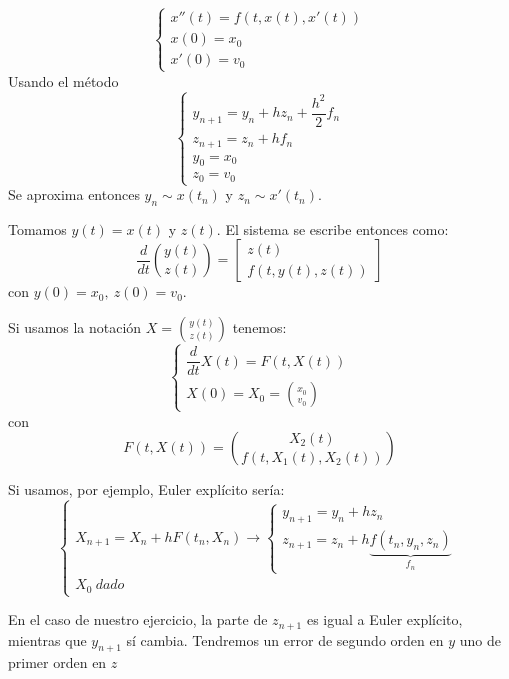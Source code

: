 \documentclass[openany]{book}
\begin{document}
    \setcounter{ex}{15}

    \begin{exercise}
        $$ \left\{
        \begin{array}{l}
            x''(t) = f(t,x(t),x'(t)) \\
            x(0) = x_0\\
            x'(0) = v_0
        \end{array}
        \right. $$
        Usando el método
        $$ \left\{
        \begin{array}{l}
            y_{n+1} = y_n+hz_n+\dfrac{h^2}{2}f_n\\
            z_{n+1} = z_n+hf_n\\
            y_0=x_0\\
            z_0=v_0
        \end{array}
        \right. $$
        Se aproxima entonces $ y_n \sim x(t_n) $ y $ z_n \sim x'(t_n) $.
        
        Tomamos $ y(t) = x(t) $ y $ z(t) $. El sistema se escribe entonces como:
        $$ \dfrac{d}{dt} \binom{y(t)}{z(t)} = \left[ \begin{matrix}
            z(t) \\ f(t,y(t),z(t))
        \end{matrix} \right] $$
        con $ y(0) = x_0,\ z(0) = v_0 $.

        Si usamos la notación $ X = \binom{y(t)}{z(t)} $ tenemos:
        $$ \left\{
        \begin{array}{l}
            \dfrac{d}{dt}X(t) = F(t,X(t))\\
            X(0) = X_0 = \binom{x_0}{v_0}
        \end{array}
        \right. $$
        con
        $$ F(t,X(t)) = \binom{X_2(t)}{f(t,X_1(t),X_2(t))} $$

        Si usamos, por ejemplo, Euler explícito sería:
        $$ \left\{
        \begin{array}{l}
            X_{n+1} = X_n + h F(t_n,X_n) \to \left\{
            \begin{array}{l}
                y_{n+1} = y_n+h z_n\\
                z_{n+1} = z_n+h\underbrace{f(t_n,y_n,z_n)}_{f_n}
            \end{array}
            \right.\\
            X_0\ dado
        \end{array}
        \right. $$

        En el caso de nuestro ejercicio, la parte de $ z_{n+1} $ es igual a Euler explícito, mientras que $ y_{n+1} $ sí cambia. Tendremos un error de segundo orden en $ y $ uno de primer orden en $ z $


\end{exercise}
\end{document}
